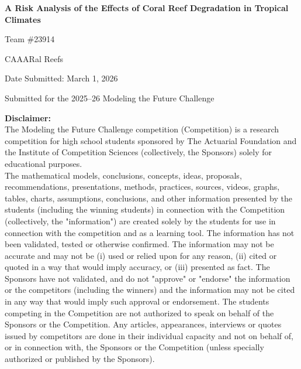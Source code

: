 \documentclass[10pt,letterpaper]{article}
\newcounter{assumption}
\begin{document}
\begin{titlepage}
    \centering
    \vspace*{1.5in}

    {\LARGE\bfseries A Risk Analysis of the Effects of Coral Reef Degradation in Tropical Climates \par}
    \vspace{1em}
    {\Large Team \#23914 \par}
    \vspace{1em}
    {\Large CAAARal Reefs \par}
    \vspace{1em}
    {\large Date Submitted: March 1, 2026 \par}
    \vspace{1em}
    {\normalsize Submitted for the 2025--26 Modeling the Future Challenge \par}

    \vfill

    {\tiny
    \color{red}
    \begin{flushleft}
    \textbf{Disclaimer:}\\
    The Modeling the Future Challenge competition (Competition) is a research competition for high school students sponsored by The Actuarial Foundation and the Institute of Competition Sciences (collectively, the Sponsors) solely for educational purposes. \\
    
    The mathematical models, conclusions, concepts, ideas, proposals, recommendations, presentations, methods, practices, sources, videos, graphs, tables, charts, assumptions, conclusions, and other information presented by the students (including the winning students) in connection with the Competition (collectively, the "information") are created solely by the students for use in connection with the competition and as a learning tool. The information has not been validated, tested or otherwise confirmed. The information may not be accurate and may not be (i) used or relied upon for any reason, (ii) cited or quoted in a way that would imply accuracy, or (iii) presented as fact. The Sponsors have not validated, and do not "approve" or "endorse" the information or the competitors (including the winners) and the information may not be cited in any way that would imply such approval or endorsement. The students competing in the Competition are not authorized to speak on behalf of the Sponsors or the Competition. Any articles, appearances, interviews or quotes issued by competitors are done in their individual capacity and not on behalf of, or in connection with, the Sponsors or the Competition (unless specially authorized or published by the Sponsors). \\ 
    

\end{flushleft}}
\end{titlepage}
\end{document}
